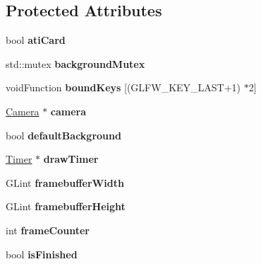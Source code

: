 \subsection*{Protected Attributes}
\begin{DoxyCompactItemize}
\item 
\mbox{\label{classtsgl_1_1_canvas_a1558f2f09228ccaf0d46cec233a2dac7}} 
bool {\bfseries ati\+Card}
\item 
\mbox{\label{classtsgl_1_1_canvas_a8d3e6035efe482c37a766dbc2dc204b0}} 
std\+::mutex {\bfseries background\+Mutex}
\item 
\mbox{\label{classtsgl_1_1_canvas_a2632acf75c73ec9b88282aaa25bfc0c5}} 
void\+Function {\bfseries bound\+Keys} \mbox{[}(G\+L\+F\+W\+\_\+\+K\+E\+Y\+\_\+\+L\+A\+ST+1) $\ast$2\mbox{]}
\item 
\mbox{\label{classtsgl_1_1_canvas_a06ddbda2735ea3802e66c3dc5450173e}} 
\hyperlink{classtsgl_1_1_camera}{Camera} $\ast$ {\bfseries camera}
\item 
\mbox{\label{classtsgl_1_1_canvas_ae28ae3d2f481f8c410f588f86382e3be}} 
bool {\bfseries default\+Background}
\item 
\mbox{\label{classtsgl_1_1_canvas_aec3d0aedf4ea4e3eba8035528bdc963c}} 
\hyperlink{classtsgl_1_1_timer}{Timer} $\ast$ {\bfseries draw\+Timer}
\item 
\mbox{\label{classtsgl_1_1_canvas_a7bd16b4d03b78574d3b4bb5b2d59cd10}} 
G\+Lint {\bfseries framebuffer\+Width}
\item 
\mbox{\label{classtsgl_1_1_canvas_afbafc7aea379e61893b63c75a6e00ac2}} 
G\+Lint {\bfseries framebuffer\+Height}
\item 
\mbox{\label{classtsgl_1_1_canvas_a8b7ca443ca91536bc3181c7f8da8d4f4}} 
int {\bfseries frame\+Counter}
\item 
\mbox{\label{classtsgl_1_1_canvas_a2bb6f7694e68f7e9fd6ab4e1d75ac591}} 
bool {\bfseries is\+Finished}

\end{DoxyCompactItemize}
